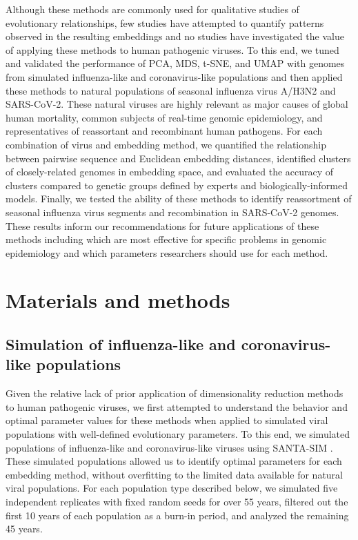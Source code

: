 \documentclass[10pt,letterpaper]{article}
\begin{document}
Although these methods are commonly used for qualitative studies of evolutionary relationships, few studies have attempted to quantify patterns observed in the resulting embeddings and no studies have investigated the value of applying these methods to human pathogenic viruses.
To this end, we tuned and validated the performance of PCA, MDS, t-SNE, and UMAP with genomes from simulated influenza-like and coronavirus-like populations and then applied these methods to natural populations of seasonal influenza virus A/H3N2 and SARS-CoV-2.
These natural viruses are highly relevant as major causes of global human mortality, common subjects of real-time genomic epidemiology, and representatives of reassortant and recombinant human pathogens.
For each combination of virus and embedding method, we quantified the relationship between pairwise sequence and Euclidean embedding distances, identified clusters of closely-related genomes in embedding space, and evaluated the accuracy of clusters compared to genetic groups defined by experts and biologically-informed models.
Finally, we tested the ability of these methods to identify reassortment of seasonal influenza virus segments and recombination in SARS-CoV-2 genomes.
These results inform our recommendations for future applications of these methods including which are most effective for specific problems in genomic epidemiology and which parameters researchers should use for each method.

\section*{Materials and methods}

\subsection*{Simulation of influenza-like and coronavirus-like populations}

Given the relative lack of prior application of dimensionality reduction methods to human pathogenic viruses, we first attempted to understand the behavior and optimal parameter values for these methods when applied to simulated viral populations with well-defined evolutionary parameters.
To this end, we simulated populations of influenza-like and coronavirus-like viruses using SANTA-SIM \cite{Jariani2019}.
These simulated populations allowed us to identify optimal parameters for each embedding method, without overfitting to the limited data available for natural viral populations.
For each population type described below, we simulated five independent replicates with fixed random seeds for over 55 years, filtered out the first 10 years of each population as a burn-in period, and analyzed the remaining 45 years.
\end{document}

